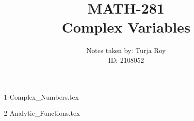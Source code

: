 \documentclass[12pt]{article}
\title{
    \textbf{MATH-281} \\
    \textbf{Complex Variables}
}
\author{
    Notes taken by: Turja Roy \\
    ID: 2108052
}
\date{}
\numberwithin{equation}{subsection}
\begin{document}
\maketitle

\tableofcontents

\newpage
{1-Complex_Numbers.tex}

\newpage
{2-Analytic_Functions.tex}
\end{document}
